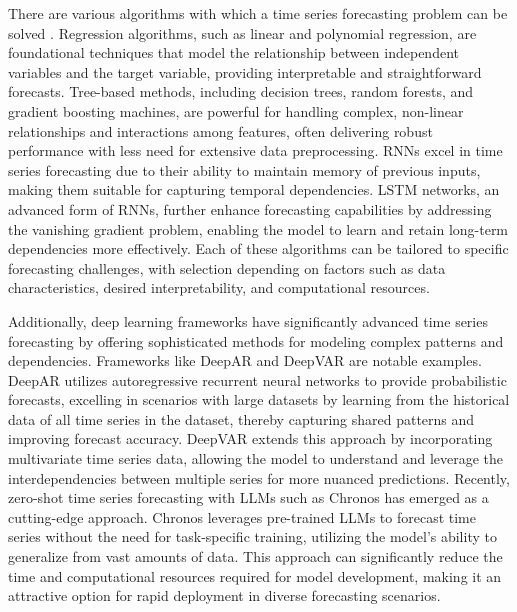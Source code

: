 There are various algorithms with which a time series forecasting problem can be solved \parencite{salinas2020deepar}. Regression algorithms, such as linear and polynomial regression, are foundational techniques that model the relationship between independent variables and the target variable, providing interpretable and straightforward forecasts. Tree-based methods, including decision trees, random forests, and gradient boosting machines, are powerful for handling complex, non-linear relationships and interactions among features, often delivering robust performance with less need for extensive data preprocessing. \ac{RNNs} excel in time series forecasting due to their ability to maintain memory of previous inputs, making them suitable for capturing temporal dependencies. \ac{LSTM} networks, an advanced form of \ac{RNNs}, further enhance forecasting capabilities by addressing the vanishing gradient problem, enabling the model to learn and retain long-term dependencies more effectively. Each of these algorithms can be tailored to specific forecasting challenges, with selection depending on factors such as data characteristics, desired interpretability, and computational resources.

Additionally, deep learning frameworks have significantly advanced time series forecasting by offering sophisticated methods for modeling complex patterns and dependencies. Frameworks like DeepAR \parencite{salinas2020deepar} and DeepVAR \parencite{cheng2020deepvar} are notable examples. DeepAR utilizes autoregressive recurrent neural networks to provide probabilistic forecasts, excelling in scenarios with large datasets by learning from the historical data of all time series in the dataset, thereby capturing shared patterns and improving forecast accuracy. DeepVAR extends this approach by incorporating multivariate time series data, allowing the model to understand and leverage the interdependencies between multiple series for more nuanced predictions. Recently, zero-shot time series forecasting with \ac{LLM}s such as Chronos \parencite{ansari2024chronos} has emerged as a cutting-edge approach. Chronos leverages pre-trained \ac{LLM}s to forecast time series without the need for task-specific training, utilizing the model's ability to generalize from vast amounts of data. This approach can significantly reduce the time and computational resources required for model development, making it an attractive option for rapid deployment in diverse forecasting scenarios.


